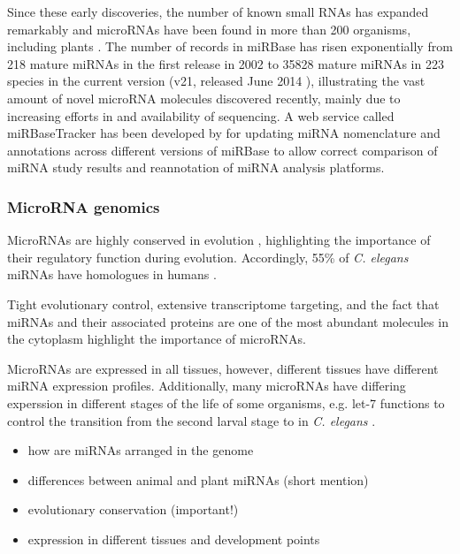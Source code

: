 Since these early discoveries, the number of known small RNAs has expanded
remarkably and microRNAs have been found in more than 200 organisms, including
plants \citep{Jones-Rhoades2006,TOINENERILAJEISTA}. 
The number of records in miRBase has risen exponentially
from %
218 mature miRNAs in the first release in 2002 to %
35828 mature miRNAs in 223 species in the current version (v21,
released June 2014 \citep{VanPeer2014,MiRBaseWeb}), illustrating the vast
amount of novel microRNA molecules discovered recently, mainly due to
increasing efforts in and availability of sequencing. A web service called
miRBaseTracker has been developed by \citet{VanPeer2014} for updating
miRNA nomenclature and annotations across different versions of miRBase to
allow correct comparison of miRNA study results and reannotation of miRNA
analysis platforms.



\subsubsection{MicroRNA genomics}\label{microrna-genomics}

MicroRNAs are highly conserved in evolution \citep{Bartel2004}, highlighting
the importance of their regulatory function during evolution. Accordingly,
55\% of \emph{C. elegans} miRNAs have homologues in humans
\cite{Ibanez-Ventoso2008}.

Tight evolutionary control, extensive transcriptome targeting, and the fact
that miRNAs and their associated proteins are one of the most abundant
molecules in the cytoplasm \citep{Bartel2004} highlight the importance of
microRNAs.

MicroRNAs are expressed in all tissues, however, different tissues
have different miRNA expression profiles. Additionally, many microRNAs
have differing experssion in different stages of the life
of some organisms, e.g. let-7 functions to control the transition
from the second larval stage to in \emph{C. elegans} \citep{Pasquelli2000}.


\begin{itemize}
\item
  how are miRNAs arranged in the genome
\item
  differences between animal and plant miRNAs (short mention)
\item
  evolutionary conservation (important!)
\item
  expression in different tissues and development points
\end{itemize}



